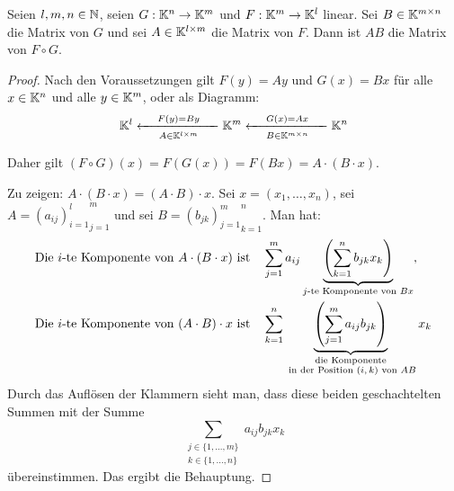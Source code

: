 \begin{thm}
	Seien $ l,m,n \in \mathbb N $, seien $ G:\mathbb K^n\to\mathbb K^m $ und $ F:\mathbb K^m\to\mathbb K^l $ linear. Sei $ B \in \mathbb K^{m \times n} $ die Matrix von $ G $ und sei $ A \in \mathbb K^{l \times m} $ die Matrix von $ F $. Dann ist $ AB $ die Matrix von $ F \circ G $.
\end{thm}
\begin{proof}
	Nach den Voraussetzungen gilt $ F(y) = Ay $ und $ G(x) = Bx $ für alle $ x \in \mathbb K^n $ und alle $ y \in \mathbb K^m $, oder als Diagramm:  	
	\begin{equation*}
		\mathbb K^l    \xleftarrow[A \in \mathbb K^{l \times m}]{\hspace{3ex} F(y) = B y \hspace{3ex}}   \mathbb K^m  \xleftarrow[B \in \mathbb K^{m \times n}]{\hspace{3ex}  G(x) = Ax \hspace{3ex}} \mathbb K^n
	\end{equation*} 

	
Daher gilt $ (F \circ G)(x) = F(G(x)) = F(Bx) = A \cdot (B \cdot x) $.
	
	Zu zeigen: $ A \cdot (B \cdot x) = (A \cdot B) \cdot x $. Sei $ x=(x_1,\ldots,x_n) $, sei $ A = {{(a_{ij})}_{i=1}^l}_{j=1}^m $ und sei $ B = {{(b_{jk})}_{j=1}^m}_{k=1}^n $. Man hat: 
	\begin{align*}
		\text{Die $ i $-te Komponente von $ A \cdot (B \cdot x) $ ist} & & &   \sum\limits_{j=1}^{m}a_{ij}\underbrace{\left( \sum\limits_{k=1}^{n}b_{jk}x_k \right)}_{\text{$ j $-te Komponente von $ Bx $}}, \vspace{3ex}
		\\ 		\text{Die $ i $-te Komponente von $ (A \cdot B) \cdot x $ ist} & & & \sum\limits_{k=1}^{n} \underbrace{\left( \sum\limits_{j=1}^{m}a_{ij}b_{jk} \right)}_{\substack{\text{die Komponente}\\ \text{ in der Position $ (i,k) $ von $ AB $}}} x_k
	\end{align*}
 	Durch das Auflösen der Klammern sieht man, dass diese beiden geschachtelten Summen mit der Summe
	\begin{equation}
		\sum\limits_{\substack{j \in \{1,\ldots,m\} \\ k \in \{1,\ldots,n\}}} a_{ij}b_{jk}x_k
	\end{equation}
	übereinstimmen. Das ergibt die Behauptung.
\end{proof}

%
%			
%		
%			

